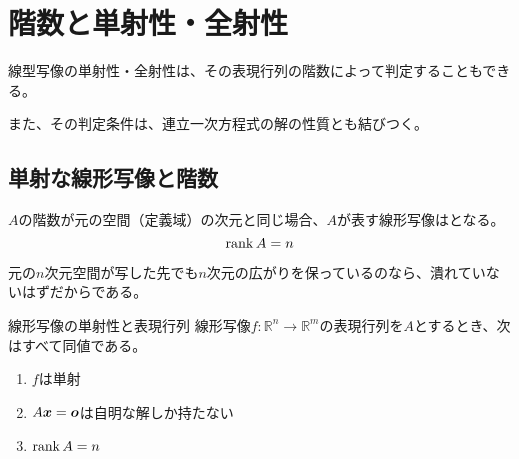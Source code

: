\documentclass[../../../topic_linear-algebra]{subfiles}
\begin{document}
\sectionline
\section{階数と単射性・全射性}

線型写像の単射性・全射性は、その表現行列の階数によって判定することもできる。

また、その判定条件は、連立一次方程式の解の性質とも結びつく。

\subsection{単射な線形写像と階数}

$A$の階数が元の空間（定義域）の次元と同じ場合、$A$が表す線形写像はとなる。
\begin{equation*}
  \rank A = n
\end{equation*}

元の$n$次元空間が写した先でも$n$次元の広がりを保っているのなら、潰れていないはずだからである。

\begin{theorem*}{線形写像の単射性と表現行列}
  線形写像$f\colon \mathbb{R}^n \to \mathbb{R}^m$の表現行列を$A$とするとき、次はすべて同値である。
  \begin{enumerate}[label=\romanlabel]
    \item $f$は単射
    \item $A\vb*{x} = \vb*{o}$は自明な解しか持たない
    \item $\rank A = n$
  \end{enumerate}
\end{theorem*}
\end{document}
